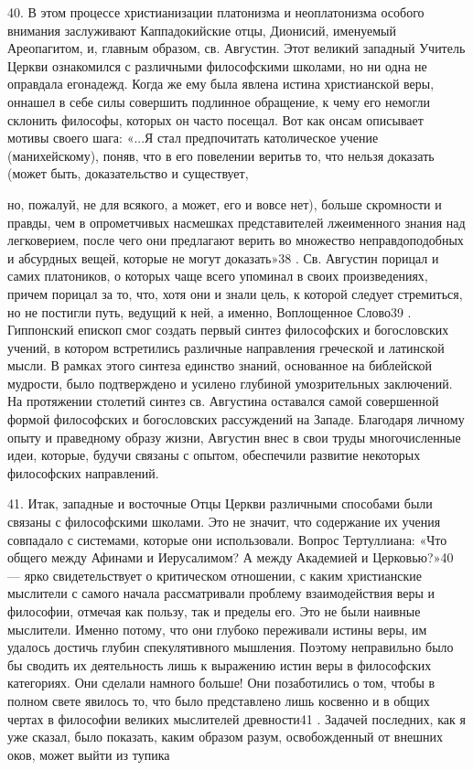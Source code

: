 \documentclass[a5paper,10pt]{article}
\begin{document}
40. В этом процессе христианизации платонизма и неоплатонизма особого внимания
заслуживают Каппадокийские отцы, Дионисий, именуемый Ареопагитом, и, главным
образом, св. Августин. Этот великий западный Учитель Церкви ознакомился с
различными философскими школами, но ни одна не оправдала егонадежд. Когда же
ему была явлена истина христианской веры, оннашел в себе силы совершить
подлинное обращение, к чему его немогли склонить философы, которых он часто
посещал. Вот как онсам описывает мотивы своего шага: «...Я стал предпочитать
католическое учение (манихейскому), поняв, что в его повелении веритьв то, что
нельзя доказать (может быть, доказательство и существует,

но, пожалуй, не для всякого, а может, его и вовсе нет), больше скромности и
правды, чем в опрометчивых насмешках представителей лжеименного знания над
легковерием, после чего они предлагают верить во множество неправдоподобных и
абсурдных вещей, которые не могут доказать»38 . Св. Августин порицал и самих
платоников, о которых чаще всего упоминал в своих произведениях, причем порицал
за то, что, хотя они и знали цель, к которой следует стремиться, но не постигли
путь, ведущий к ней, а именно, Воплощенное Слово39 . Гиппонский епископ смог
создать первый синтез философских и богословских учений, в котором встретились
различные направления греческой и латинской мысли. В рамках этого синтеза
единство знаний, основанное на библейской мудрости, было подтверждено и усилено
глубиной умозрительных заключений. На протяжении столетий синтез св. Августина
оставался самой совершенной формой философских и богословских рассуждений на
Западе. Благодаря личному опыту и праведному образу жизни, Августин внес в свои
труды многочисленные идеи, которые, будучи связаны с опытом, обеспечили
развитие некоторых философских направлений.

41. Итак, западные и восточные Отцы Церкви различными способами были связаны с
философскими школами. Это не значит, что содержание их учения совпадало с
системами, которые они использовали. Вопрос Тертуллиана: «Что общего между
Афинами и Иерусалимом? А между Академией и Церковью?»40 — ярко свидетельствует
о критическом отношении, с каким христианские мыслители с самого начала
рассматривали проблему взаимодействия веры и философии, отмечая как пользу, так
и пределы его. Это не были наивные мыслители. Именно потому, что они глубоко
переживали истины веры, им удалось достичь глубин спекулятивного мышления.
Поэтому неправильно было бы сводить их деятельность лишь к выражению истин веры
в философских категориях. Они сделали намного больше! Они позаботились о том,
чтобы в полном свете явилось то, что было представлено лишь косвенно и в общих
чертах в философии великих мыслителей древности41 . Задачей последних, как я
уже сказал, было показать, каким образом разум, освобожденный от внешних оков,
может выйти из тупика
\end{document}
